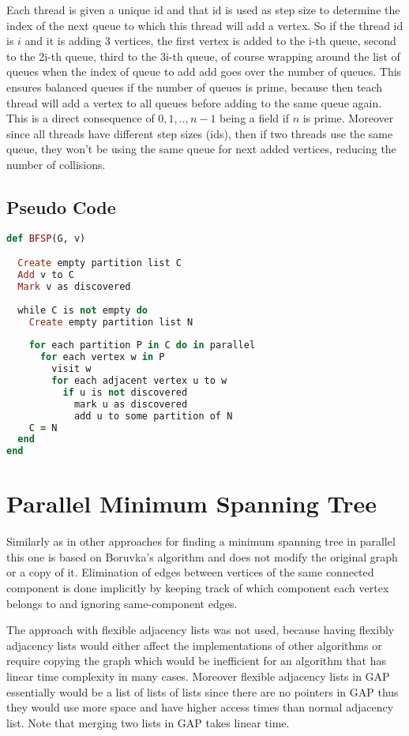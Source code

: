 \documentclass{report}
\theoremstyle{plain}
\theoremstyle{definition}
\theoremstyle{remark}
\begin{document}
Each thread is given a unique id and that id is used as step size to determine the index of the next queue to which this thread will add a vertex. So if the thread id is $i$ and it is adding 3 vertices, the first vertex is added to the i-th queue, second to the 2i-th queue, third to the 3i-th queue, of course wrapping around the list of queues when the index of queue to add add goes over the number of queues. This ensures balanced queues if the number of queues is prime, because then teach thread will add a vertex to all queues before adding to the same queue again. This is a direct consequence of ${0, 1,..,n-1}$ being a field if $n$ is prime. Moreover since all threads have different step sizes (ids), then if two threads use the same queue, they won't be using the same queue for next added vertices, reducing the number of collisions.

\subsection*{Pseudo Code} 
\begin{lstlisting}[language=Ruby]
def BFSP(G, v)

  Create empty partition list C
  Add v to C
  Mark v as discovered
  
  while C is not empty do
    Create empty partition list N
  	
    for each partition P in C do in parallel
      for each vertex w in P
        visit w
        for each adjacent vertex u to w
          if u is not discovered  	      
            mark u as discovered
            add u to some partition of N
    C = N
  end
end
\end{lstlisting}

\section{Parallel Minimum Spanning Tree}

Similarly as in other approaches \cite{Bader20061366} for finding a minimum spanning tree in parallel this one is based on Boruvka's algorithm and does not modify the original graph or a copy of it. Elimination of edges between vertices of the same connected component is done implicitly by keeping track of which component each vertex belongs to and ignoring same-component edges.

The approach with flexible adjacency lists \cite{Bader20061366} was not used, because having flexibly adjacency lists would either affect the implementations of other algorithms or require copying the graph which would be inefficient for an algorithm that has linear time complexity in many cases. Moreover flexible adjacency lists in GAP essentially would be a list of lists of lists since there are no pointers in GAP thus they would use more space and have higher access times than normal adjacency list. Note that merging two lists in GAP takes linear time.
\end{document}
